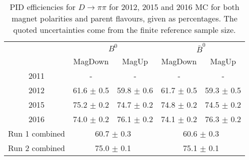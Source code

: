 \begin{table}
    \centering
    \begin{tabular}{ccccc}
        \toprule
        & \multicolumn{2}{c}{$B^0$} &  \multicolumn{2}{c}{$\bar{B}^0$}\\
        & MagDown & MagUp & MagDown & MagUp\\
        \midrule
2011 & - & - & - & - \\
2012 & 61.6 $\pm$ 0.5 & 59.8 $\pm$ 0.6 & 61.7 $\pm$ 0.5 & 59.3 $\pm$ 0.5 \\
2015 & 75.2 $\pm$ 0.2 & 74.7 $\pm$ 0.2 & 74.8 $\pm$ 0.2 & 74.5 $\pm$ 0.2 \\
2016 & 74.0 $\pm$ 0.2 & 76.1 $\pm$ 0.2 & 74.1 $\pm$ 0.2 & 76.3 $\pm$ 0.2 \\
        \midrule
Run 1 combined & \multicolumn{2}{c}{60.7 $\pm$ 0.3} & \multicolumn{2}{c}{60.6 $\pm$ 0.3} \\
Run 2 combined & \multicolumn{2}{c}{75.0 $\pm$ 0.1} & \multicolumn{2}{c}{75.1 $\pm$ 0.1} \\
        \bottomrule
    \end{tabular}
    \caption{PID efficiencies for $D \to \pi\pi$ for 2012, 2015 and 2016 MC for both magnet polarities and parent flavours, given as percentages. The quoted  uncertainties come from the finite reference sample size.}
\label{tab:PID_efficiency_pipi}
\end{table}
